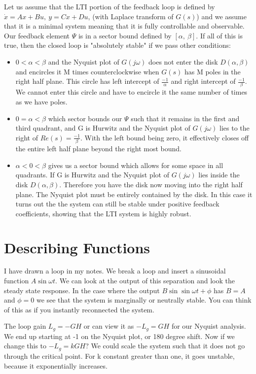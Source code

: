 \documentclass[11pt]{article}
\begin{document}
Let us assume that the LTI portion of the feedback loop is defined by $\dot{x} = Ax + Bu, \ y = Cx + Du$, (with Laplace transform of $G(s)$) and we assume that it is a minimal system meaning that it is fully controllable and observable. Our feedback element $\Psi$ is in a sector bound defined by $[\alpha, \ \beta]$. If all of this is true, then the closed loop is "absolutely stable" if we pass other conditions:

\begin{itemize}
	\item $0<\alpha<\beta$ and the Nyquist plot of $G(j\omega)$ does not enter the disk $D(\alpha,\beta)$ and encircles it M times counterclockwise when $G(s)$ has M poles in the right half plane. This circle has left intercept of $\frac{-1}{\alpha}$ and right intercept of $\frac{-1}{\beta}$. We cannot enter this circle and have to encircle it the same number of times as we have poles.
	\item $0 = \alpha < \beta$ which sector bounds our $\Psi$ such that it remains in the first and third quadrant, and G is Hurwitz and the Nyquist plot of $G(j \omega)$ lies to the right of $Re(s) = \frac{-1}{\beta}$. With the left bound being zero, it effectively closes off the entire left half plane beyond the right most bound.	
	\item $\alpha < 0 < \beta$ gives us a sector bound which allows for some space in all quadrants. If G is Hurwitz and the Nyquist plot of $G(j \omega)$ lies inside the disk $D(\alpha, \beta)$. Therefore you have the disk now moving into the right half plane. The Nyquist plot must be entirely contained by the disk.  In this case it turns out the the system can still be stable under positive feedback coefficients, showing that the LTI system is highly robust.
\end{itemize}

\section*{Describing Functions}
I have drawn a loop in my notes. We break a loop and insert a sinusoidal function $A \sin{\omega t}$. We can look at the output of this separation and look the steady state response. In the case where the output $B\sin\sin{\omega t + \phi}$ has $B=A$ and $\phi =0 $ we see that the system is marginally or neutrally stable. You can think of this as if you instantly reconnected the system.

The loop gain $L_g = -GH$ or can view it as $-L_g = GH$ for our Nyquist analysis. We end up starting at -1 on the Nyquist plot, or 180 degree shift. Now if we change this to $-L_g = kGH$? We could scale the system such that it does not go through the critical point. For k constant greater than one, it goes unstable, because it exponentially increases.
\end{document}
